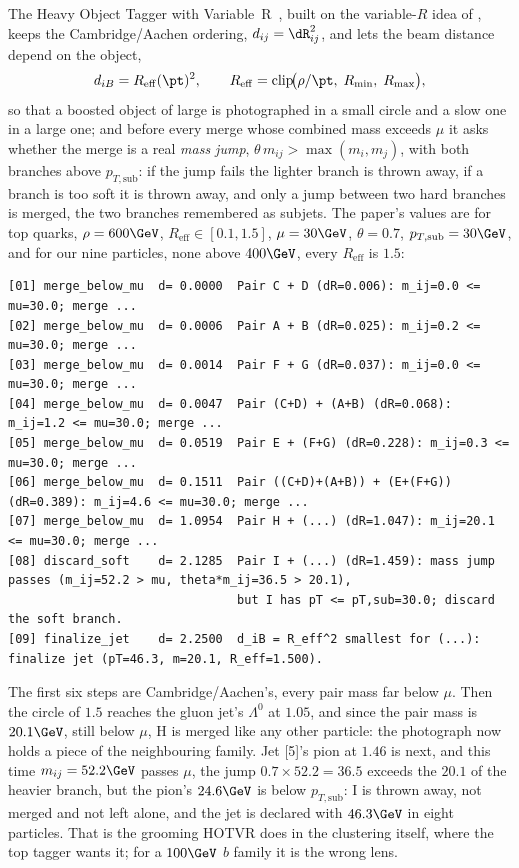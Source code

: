 The Heavy Object Tagger with Variable~R~\cite{Lapsien:2016zor}, built on
the variable-$R$ idea of \cite{Krohn:2009zg}, keeps the Cambridge/Aachen
ordering, $\dij=\dR_{ij}^2$, and lets the beam distance depend on the
object,
\begin{equation}
  \diB=R_{\mathrm{eff}}(\pt)^2,\qquad
  R_{\mathrm{eff}}=\mathrm{clip}\!\big(\rho/\pt,\;R_{\min},\;R_{\max}\big),
  \label{eq:family_photograph:hotvr}
\end{equation}
so that a boosted object of large \pt is photographed in a small circle
and a slow one in a large one; and before every merge whose combined
mass exceeds $\mu$ it asks whether the merge is a real \emph{mass jump},
$\theta\,m_{ij}>\max(m_i,m_j)$, with both branches above $p_{T,\mathrm{sub}}$:
if the jump fails the lighter branch is thrown away, if a branch is too
soft it is thrown away, and only a jump between two hard branches is
merged, the two branches remembered as subjets. The paper's values are
for top quarks, $\rho=600\GeV$, $R_{\mathrm{eff}}\in[0.1,1.5]$,
$\mu=30\GeV$, $\theta=0.7$, $p_{T,\mathrm{sub}}=30\GeV$, and for our
nine particles, none above $400\GeV$, every $R_{\mathrm{eff}}$ is $1.5$:
\begin{verbatim}
[01] merge_below_mu  d= 0.0000  Pair C + D (dR=0.006): m_ij=0.0 <= mu=30.0; merge ...
[02] merge_below_mu  d= 0.0006  Pair A + B (dR=0.025): m_ij=0.2 <= mu=30.0; merge ...
[03] merge_below_mu  d= 0.0014  Pair F + G (dR=0.037): m_ij=0.0 <= mu=30.0; merge ...
[04] merge_below_mu  d= 0.0047  Pair (C+D) + (A+B) (dR=0.068): m_ij=1.2 <= mu=30.0; merge ...
[05] merge_below_mu  d= 0.0519  Pair E + (F+G) (dR=0.228): m_ij=0.3 <= mu=30.0; merge ...
[06] merge_below_mu  d= 0.1511  Pair ((C+D)+(A+B)) + (E+(F+G)) (dR=0.389): m_ij=4.6 <= mu=30.0; merge ...
[07] merge_below_mu  d= 1.0954  Pair H + (...) (dR=1.047): m_ij=20.1 <= mu=30.0; merge ...
[08] discard_soft    d= 2.1285  Pair I + (...) (dR=1.459): mass jump passes (m_ij=52.2 > mu, theta*m_ij=36.5 > 20.1),
                                but I has pT <= pT,sub=30.0; discard the soft branch.
[09] finalize_jet    d= 2.2500  d_iB = R_eff^2 smallest for (...): finalize jet (pT=46.3, m=20.1, R_eff=1.500).
\end{verbatim}
The first six steps are Cambridge/Aachen's, every pair mass far below
$\mu$. Then the circle of $1.5$ reaches the gluon jet's $\Lambda^0$ at
$1.05$, and since the pair mass is $20.1\GeV$, still below $\mu$, H is
merged like any other particle: the photograph now holds a piece of the
neighbouring family. Jet [5]'s pion at $1.46$ is next, and this time
$m_{ij}=52.2\GeV$ passes $\mu$, the jump $0.7\times52.2=36.5$ exceeds the
$20.1$ of the heavier branch, but the pion's $24.6\GeV$ is below
$p_{T,\mathrm{sub}}$: I is thrown away, not merged and not left alone,
and the jet is declared with $46.3\GeV$ in eight particles. That is the
grooming HOTVR does in the clustering itself, where the top tagger wants
it; for a $100\GeV$ $b$ family it is the wrong lens.

